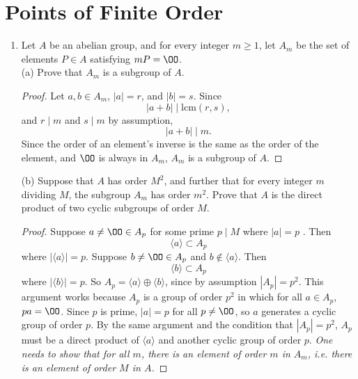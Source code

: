 \documentclass[11pt, oneside]{article}
\begin{document}
\section{Points of Finite Order}
\begin{enumerate}
\setlength{\parindent}{0pt}
\item Let $A$ be an abelian group, and for every integer $m\ge  1$, let $A_m$ be the set of elements $P\in A$ satisfying $mP=\OO$.\\
(a) Prove that $A_m$ is a subgroup of $A$.
\begin{proof}
Let $a,b\in A_m$, $|a|=r$, and $|b|=s$. Since 
$$
|a+b| \mid \textrm{lcm}(r,s),
$$
and $r\mid m$ and $s\mid m$ by assumption, 
$$
|a+b| \mid m.
$$ 
Since the order of an element's inverse is the same as the order of the element, and $\OO$ is always in $A_m$, $A_m$ is a subgroup of $A$.
\end{proof}
(b) Suppose that $A$ has order $M^2$, and further that for every integer $m$ dividing $M$, the subgroup $A_m$ has order $m^2$. Prove that $A$ is the direct product of two cyclic subgroups of order $M$. 
\begin{proof}
Suppose $a \neq \OO \in A_p$ for some prime $p\mid M$ where $|a| = p$ . Then 
$$
\langle a\rangle \subset A_p
$$
where $|\langle a\rangle| = p$. Suppose $b \neq \OO \in A_p$ and $b\notin \langle a \rangle$. Then 
$$
\langle b\rangle \subset A_p
$$
where $|\langle b\rangle| = p$. So $A_p = \langle a\rangle \oplus \langle b\rangle$, since by assumption $|A_p| =p^2$. This argument works because $A_p$ is a group of order $p^2$ in which for all $a\in A_p$, $pa = \OO$. Since $p$ is prime, $|a| = p$ for all $p\neq \OO$, so $a$ generates a cyclic group of order $p$. By the same argument and the condition that $|A_p| = p^2$, $A_p$ must be a direct product of $\langle a\rangle$ and another cyclic group of order $p$. 
\textit{One needs to show that for all $m$, there is an element of order $m$ in $A_m$, i.e. there is an element of order $M$ in $A$.}
\end{proof}

\end{enumerate}
\end{document}
